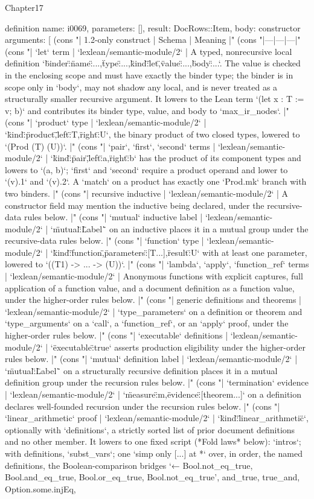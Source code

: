 \begin{lexlean}{Chapter17}
\begin{semanticmodule}
definition{
  name: i0069,
  parameters: [],
  result: DocRows::Item,
  body: constructor{
    arguments: [
      (cons "| 1.2-only construct | Schema | Meaning |" (cons "|---|---|---|" (cons "| `let` term | `lexlean/semantic-module/2` | A typed, nonrecursive local definition `{\"binder\":{\"name\":...,\"type\":...},\"kind\":\"let\",\"value\":...,\"body\":...}`. The value is checked in the enclosing scope and must have exactly the binder type; the binder is in scope only in `body`, may not shadow any local, and is never treated as a structurally smaller recursive argument. It lowers to the Lean term `(let x : T := v; b)` and contributes its binder type, value, and body to `max_ir_nodes`. |" (cons "| `product` type | `lexlean/semantic-module/2` | `{\"kind\":\"product\",\"left\":T,\"right\":U}`, the binary product of two closed types, lowered to `(Prod (T) (U))`. |" (cons "| `pair`, `first`, `second` terms | `lexlean/semantic-module/2` | `{\"kind\":\"pair\",\"left\":a,\"right\":b}` has the product of its component types and lowers to `(a, b)`; `first` and `second` require a product operand and lower to `(v).1` and `(v).2`. A `match` on a product has exactly one `Prod.mk` branch with two binders. |" (cons "| recursive inductive | `lexlean/semantic-module/2` | A constructor field may mention the inductive being declared, under the recursive-data rules below. |" (cons "| `mutual` inductive label | `lexlean/semantic-module/2` | `\"mutual\":\"Label\"` on an inductive places it in a mutual group under the recursive-data rules below. |" (cons "| `function` type | `lexlean/semantic-module/2` | `{\"kind\":\"function\",\"parameters\":[T...],\"result\":U}` with at least one parameter, lowered to `((T1) -> ... -> (U))`. |" (cons "| `lambda`, `apply`, `function_ref` terms | `lexlean/semantic-module/2` | Anonymous functions with explicit captures, full application of a function value, and a document definition as a function value, under the higher-order rules below. |" (cons "| generic definitions and theorems | `lexlean/semantic-module/2` | `type_parameters` on a definition or theorem and `type_arguments` on a `call`, a `function_ref`, or an `apply` proof, under the higher-order rules below. |" (cons "| `executable` definitions | `lexlean/semantic-module/2` | `\"executable\":true` asserts production eligibility under the higher-order rules below. |" (cons "| `mutual` definition label | `lexlean/semantic-module/2` | `\"mutual\":\"Label\"` on a structurally recursive definition places it in a mutual definition group under the recursion rules below. |" (cons "| `termination` evidence | `lexlean/semantic-module/2` | `{\"measure\":m,\"evidence\":[theorem...]}` on a definition declares well-founded recursion under the recursion rules below. |" (cons "| `linear_arithmetic` proof | `lexlean/semantic-module/2` | `{\"kind\":\"linear_arithmetic\"}`, optionally with `definitions`, a strictly sorted list of prior document definitions and no other member. It lowers to one fixed script (*Fold laws* below): `intros`; with definitions, `subst_vars`; one `simp only [...] at *` over, in order, the named definitions, the Boolean-comparison bridges `← Bool.not_eq_true, Bool.and_eq_true, Bool.or_eq_true, Bool.not_eq_true', and_true, true_and, Option.some.injEq, }}
\end{semanticmodule}
\end{lexlean}
